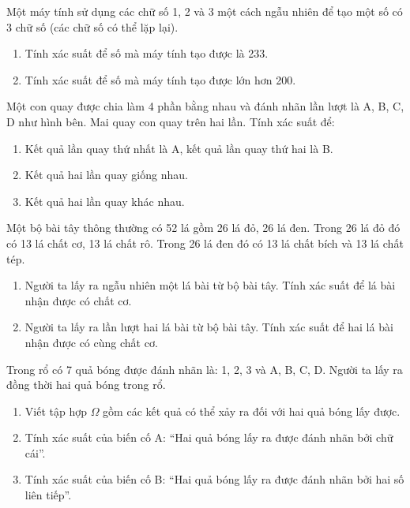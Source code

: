 \documentclass[%
    fontsize=12pt,%
    chapterprefix=false,%
    open=right,%
    twoside=false,%
    numbers=noenddot,%
    headings=optiontohead,%
    final,%
    DIV=15,%
    parskip=half %
]{scrbook}
\begin{document}
\begin{tuluan}
\item Một máy tính sử dụng các chữ số 1, 2 và 3 một cách ngẫu nhiên để tạo một số có 3 chữ số (các chữ số có thể lặp lại).
\begin{enumerate}[label=\alph*)]
  \item[a)] Tính xác suất để số mà máy tính tạo được là 233.
  \item[b)] Tính xác suất để số mà máy tính tạo được lớn hơn 200.
\end{enumerate}

\item Một con quay được chia làm 4 phần bằng nhau và đánh nhãn lần lượt là A, B, C, D như hình bên. Mai quay con quay trên hai lần. Tính xác suất để:
\begin{enumerate}[label=\alph*)]
  \item[a)] Kết quả lần quay thứ nhất là A, kết quả lần quay thứ hai là B.
  \item[b)] Kết quả hai lần quay giống nhau.
  \item[c)] Kết quả hai lần quay khác nhau.
\end{enumerate}

\item Một bộ bài tây thông thường có 52 lá gồm 26 lá đỏ, 26 lá đen. Trong 26 lá đỏ đó có 13 lá chất cơ, 13 lá chất rô. Trong 26 lá đen đó có 13 lá chất bích và 13 lá chất tép.
\begin{enumerate}[label=\alph*)]
  \item[a)] Người ta lấy ra ngẫu nhiên một lá bài từ bộ bài tây. Tính xác suất để lá bài nhận được có chất cơ.
  \item[b)] Người ta lấy ra lần lượt hai lá bài từ bộ bài tây. Tính xác suất để hai lá bài nhận được có cùng chất cơ.
\end{enumerate}

\item Trong rổ có 7 quả bóng được đánh nhãn là: 1, 2, 3 và A, B, C, D. Người ta lấy ra đồng thời hai quả bóng trong rổ.
\begin{enumerate}[label=\alph*)]
  \item[a)] Viết tập hợp $ \Omega $ gồm các kết quả có thể xảy ra đối với hai quả bóng lấy được.
  \item[b)] Tính xác suất của biến cố A: ``Hai quả bóng lấy ra được đánh nhãn bởi chữ cái''.
  \item[c)] Tính xác suất của biến cố B: ``Hai quả bóng lấy ra được đánh nhãn bởi hai số liên tiếp''.
\end{enumerate}


\end{tuluan}
\end{document}
